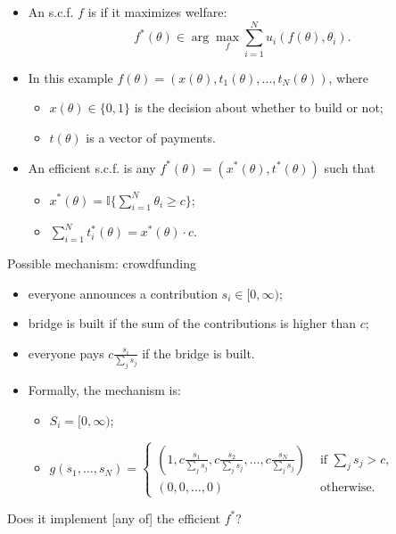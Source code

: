 \documentclass[english]{beamer}		%
\def\lyxframeend{} %
\begin{document}
\begin{itemize}
	\item An s.c.f. $f$ is  if it maximizes welfare:
	$$f^*(\theta) \in \arg \max_{f} \sum_{i=1}^{N} u_i(f(\theta),\theta_i).$$
	\pause
	\item In this example $f(\theta) = (x(\theta), t_1(\theta), ..., t_N(\theta))$, where
	\begin{itemize}
		\item $x(\theta) \in \{0,1\}$ is the decision about whether to build or not;
		\item $t(\theta)$ is a vector of payments.
	\end{itemize}
	\item An efficient s.c.f. is any $f^*(\theta)=(x^*(\theta),t^*(\theta))$ such that 
	\begin{itemize}
		\item $x^*(\theta) = \mathbb{I} \{ \sum_{i=1}^{N} \theta_i \geq c \}$;
		\item $\sum_{i=1}^{N} t^*_i(\theta) = x^*(\theta) \cdot c$.
	\end{itemize}
\end{itemize}
\lyxframeend


\begin{exampleblock}{Possible mechanism: crowdfunding}
	\begin{itemize}
		\item everyone announces a contribution $s_{i}\in[0,\infty)$;
		\item bridge is built if the sum of the contributions is higher than $c$;
		\item everyone pays $c\frac{s_{i}}{\sum_{j}s_{j}}$ if the bridge is built.
		\pause
		\item Formally, the mechanism is:
		\begin{itemize}
			\item $S_{i}= [0,\infty)$;
			\item $g(s_{1},\dots,s_{N})=
			\begin{cases}
				\left(1,c\frac{s_{1}}{\sum_{j}s_{j}},c\frac{s_{2}}{\sum_{j}s_{j}},\dots,c\frac{s_{N}}{\sum_{j}s_{j}}\right) &\text{ if } \sum_{j}s_{j}>c, \\
				(0,0,\dots,0) &\text{ otherwise.}
			\end{cases}
			$
		\end{itemize}
	\end{itemize}
\end{exampleblock}
\pause
Does it implement [any of] the efficient $f^*$?
\lyxframeend
\end{document}
